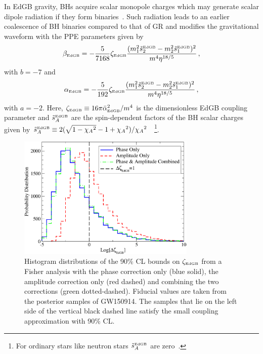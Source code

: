 \documentclass[prd,twocolumn,nofootinbib]{revtex4-1}
\newcommand{\EDGB}{{\mbox{\tiny EdGB}}}
\begin{document}
In EdGB gravity, BHs acquire scalar monopole charges which may generate scalar dipole radiation if they form binaries~\cite{Yagi:2011xp,Sotiriou:2014pfa,Berti:2018cxi,Prabhu:2018aun}. Such radiation leads to an earlier coalescence of BH binaries compared to that of GR and modifies the gravitational waveform with the PPE parameters given by~\cite{Yunes:2016jcc,Yagi:2011xp}
\begin{equation}
 \beta_\EDGB=-\frac{5}{7168}\zeta_\EDGB\frac{(m_1^2\tilde s_2^\EDGB-m_2^2\tilde s_1^\EDGB)^2}{m^4\eta^{18/5}}\,,
 \end{equation}
 with $b=-7$ and 
  \begin{equation}
 \alpha_\EDGB=-\frac{5}{192}\zeta_\EDGB\frac{(m_1^2 \tilde s_2^\EDGB-m_2^2 \tilde s_1^\EDGB)^2}{m^4\eta^{18/5}}\,,
 \end{equation}
 with $a=-2$.  Here, $\zeta_\EDGB\equiv 16 \pi \bar{\alpha}_\EDGB^2/m^4$ is the dimensionless EdGB coupling parameter and $\tilde s_{A}^\EDGB$ are the spin-dependent factors of the BH scalar charges given by $\tilde s_{A}^\EDGB\equiv 2(\sqrt{1-{\chi_A}^2}-1+{\chi_A}^2)/{\chi_A}^2~$~\cite{Berti:2018cxi,Prabhu:2018aun}\footnote{For ordinary stars like neutron stars $\tilde s_A^\EDGB$ are zero~\cite{Yagi:2011xp,Yagi:2015oca}.}.

\begin{figure}[htb]
\includegraphics[width=8.5cm]{histogram-gw150914.pdf}
\caption{Histogram distributions of the 90\% CL bounds on $\zeta_{\EDGB}$ from a Fisher analysis with the phase correction only (blue solid), the amplitude correction only (red dashed) and combining the two corrections (green dotted-dashed). Fiducial values are taken from the posterior samples of GW150914. The samples that lie on the left side of the vertical black dashed line satisfy the small coupling approximation with 90\% CL.}
\label{fig:histogram-edgb}
\end{figure}
\end{document}
